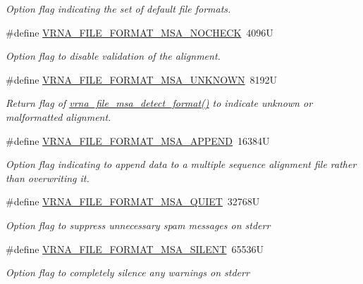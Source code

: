 \begin{DoxyCompactItemize}
\begin{DoxyCompactList}\small\item\em Option flag indicating the set of default file formats. \end{DoxyCompactList}\item 
\#define \hyperlink{group__file__formats__msa_ga229fb3778ecabea4782902b69fa48fd1}{V\+R\+N\+A\+\_\+\+F\+I\+L\+E\+\_\+\+F\+O\+R\+M\+A\+T\+\_\+\+M\+S\+A\+\_\+\+N\+O\+C\+H\+E\+CK}~4096U
\begin{DoxyCompactList}\small\item\em Option flag to disable validation of the alignment. \end{DoxyCompactList}\item 
\#define \hyperlink{group__file__formats__msa_gabdc948f547e550125de3e7c65878400c}{V\+R\+N\+A\+\_\+\+F\+I\+L\+E\+\_\+\+F\+O\+R\+M\+A\+T\+\_\+\+M\+S\+A\+\_\+\+U\+N\+K\+N\+O\+WN}~8192U
\begin{DoxyCompactList}\small\item\em Return flag of \hyperlink{group__file__formats__msa_ga627ac281b5f11c63861726e6472626c9}{vrna\+\_\+file\+\_\+msa\+\_\+detect\+\_\+format()} to indicate unknown or malformatted alignment. \end{DoxyCompactList}\item 
\#define \hyperlink{group__file__formats__msa_ga1577ea0f497d9c501549c863a4f2c089}{V\+R\+N\+A\+\_\+\+F\+I\+L\+E\+\_\+\+F\+O\+R\+M\+A\+T\+\_\+\+M\+S\+A\+\_\+\+A\+P\+P\+E\+ND}~16384U
\begin{DoxyCompactList}\small\item\em Option flag indicating to append data to a multiple sequence alignment file rather than overwriting it. \end{DoxyCompactList}\item 
\#define \hyperlink{group__file__formats__msa_ga73aa3701a22c5acfcb2e8927287a0554}{V\+R\+N\+A\+\_\+\+F\+I\+L\+E\+\_\+\+F\+O\+R\+M\+A\+T\+\_\+\+M\+S\+A\+\_\+\+Q\+U\+I\+ET}~32768U
\begin{DoxyCompactList}\small\item\em Option flag to suppress unnecessary spam messages on {\ttfamily stderr} \end{DoxyCompactList}\item 
\#define \hyperlink{group__file__formats__msa_gad98ca08968d19f221f29d2a1faf26887}{V\+R\+N\+A\+\_\+\+F\+I\+L\+E\+\_\+\+F\+O\+R\+M\+A\+T\+\_\+\+M\+S\+A\+\_\+\+S\+I\+L\+E\+NT}~65536U
\begin{DoxyCompactList}\small\item\em Option flag to completely silence any warnings on {\ttfamily stderr} \end{DoxyCompactList}\end{DoxyCompactItemize}
